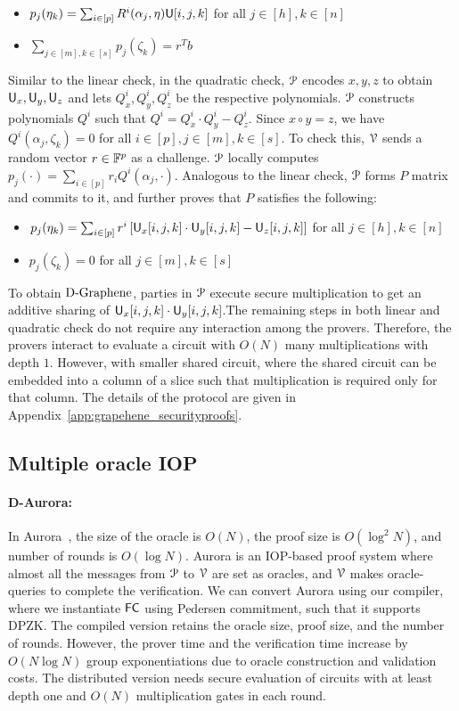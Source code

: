\begin{itemize}
	\item $p_j(\eta_k) = \sum_{i\in[p]} R^i(\alpha_j, \eta) \mathsf{U}[i,j,k]$ for all $j \in [h], k \in [n]$
	\item $\sum_{j\in [m], k\in [s]} p_j (\zeta_k) = r^Tb$
\end{itemize}
%
Similar to the linear check, in the quadratic check, $\mathcal{P}$ encodes $x,y,z$ to obtain $\mathsf{U}_x, \mathsf{U}_y, \mathsf{U}_z$ and lets $Q^i_x, Q^i_y, Q^i_z$  be the respective polynomials. $\mathcal{P}$ constructs polynomials $Q^i$ such that $Q^i = Q^i_x\cdot Q^i_y - Q^i_z$. Since $x\circ y = z$, we have $Q^i(\alpha_j,\zeta_k) = 0$ for all $i\in[p], j\in[m], k\in[s]$. To check this, $\mathcal{V}$ sends a random vector $r\in \mathbb{F}^p$ as a challenge. $\mathcal{P}$ locally computes $p_j(\cdot) = \sum_{i \in [p]} r_i Q^i(\alpha_j, \cdot)$. Analogous to the linear check, $\mathcal{P}$ forms $P$ matrix and commits to it, and further proves that $P$ satisfies the following:
\begin{itemize}
	\item $p_j(\eta_k) = \sum_{i\in[p]} r^i \left[\mathsf{U}_x[i,j,k] \cdot \mathsf{U}_y[i,j,k] - \mathsf{U}_z[i,j,k]\right]$ for all $j \in [h], k \in [n]$
	\item $p_j (\zeta_k) = 0$ for all $j \in [m], k \in [s]$
\end{itemize}
%
To obtain $\text{D-Graphene}$, parties in $\mathcal{P}$ execute secure multiplication to get an additive sharing of $\mathsf{U}_x[i,j,k] \cdot \mathsf{U}_y[i,j,k]$.The remaining steps in both linear and quadratic check do not require any interaction among the provers. Therefore, the provers interact to evaluate a circuit with $O(N)$ many multiplications with depth $1$. However, with smaller shared circuit, where the shared circuit can be embedded into a
column of a slice such that multiplication is required only for that column.
The details of the protocol are given in Appendix~\ref{app:grapehene_securityproofs}.


\subsection{Multiple oracle IOP}
\paragraph*{D-Aurora:}
In Aurora~\cite{aurora}, the size of the oracle is $O(N)$, the proof size is $O(\log^2 N)$, and number of rounds is $O(\log N)$. Aurora is an IOP-based proof system where almost all the messages from $\mathcal{P}$ to $\mathcal{V}$ are set as oracles, and $\mathcal{V}$ makes oracle-queries to complete the verification.
We can convert Aurora using our compiler, where we instantiate $\mathsf{FC}$ using Pedersen commitment, such that it supports DPZK. The compiled version retains the oracle size, proof size, and the number of rounds. However, the prover time and the verification time increase by $O(N\log N)$ group exponentiations due to oracle construction and validation costs. The distributed version needs secure evaluation of circuits with at least depth one and $O(N)$ multiplication gates in each round.
